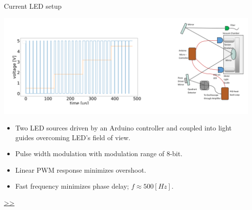 \documentclass{beamer}
\begin{document}
\begin{frame}{\hypertarget{frame:Current LED setup}{Current LED setup}}

	\begin{center}		
		\includegraphics[width=1\textwidth,keepaspectratio]{led_setup.png}
	\end{center}
	\begin{itemize}		
		\item Two LED sources driven by an Arduino controller and coupled into light guides overcoming LED's field of view.
		\item Pulse width modulation with modulation range of 8-bit.
		\item Linear PWM response minimizes overshoot.
		\item Fast frequency minimizes phase delay; $f \approx 500[Hz]$.
		
		
	\end{itemize}
	\hyperlink{frame:Current LED setup 1}{>>} 
\end{frame}
\end{document}
